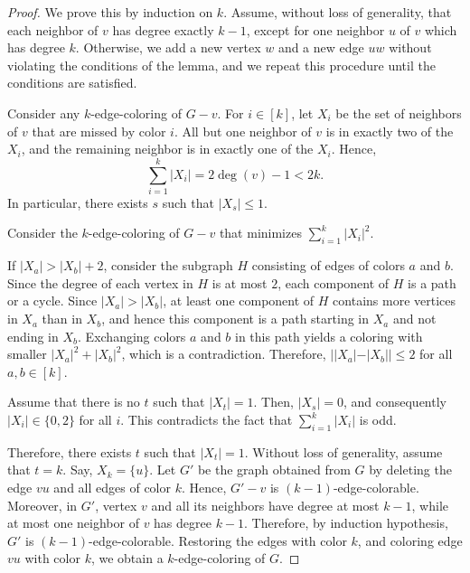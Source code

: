 \begin{proof}
    We prove this by induction on \(k\).
    Assume, without loss of generality,
    that each neighbor of \(v\) has degree exactly \(k-1\),
    except for one neighbor \(u\) of \(v\) which has degree \(k\).
    Otherwise, we add a new vertex \(w\) and a new edge \(uw\) without violating the conditions of the lemma,
    and we repeat this procedure until the conditions are satisfied.

    Consider any \(k\)-edge-coloring of \(G - v\).
    For \(i \in [k]\),
    let \(X_i\) be the set of neighbors of \(v\) that are missed by color \(i\).
    All but one neighbor of \(v\) is in exactly two of the \(X_i\),
    and the remaining neighbor is in exactly one of the \(X_i\).
    Hence,
    \begin{equation}
        \sum_{i=1}^k |X_i| = 2\deg(v) - 1 < 2k.
    \end{equation}
    In particular, there exists \(s\) such that \(|X_s| \leq 1\).

    Consider the \(k\)-edge-coloring of \(G - v\) that minimizes \(\sum_{i=1}^k |X_i|^2\).

    If \(|X_a| > |X_b| + 2\),
    consider the subgraph \(H\) consisting of edges of colors \(a\) and \(b\).
    Since the degree of each vertex in \(H\) is at most \(2\),
    each component of \(H\) is a path or a cycle.
    Since \(|X_a| > |X_b|\),
    at least one component of \(H\) contains more vertices in \(X_a\) than in \(X_b\),
    and hence this component is a path starting in \(X_a\) and not ending in \(X_b\).
    Exchanging colors \(a\) and \(b\) in this path
    yields a coloring with smaller \(|X_a|^2 + |X_b|^2\),
    which is a contradiction.
    Therefore,
    \(| |X_a| - |X_b| | \leq 2\) for all \(a, b \in [k]\).

    Assume that there is no \(t\) such that \(|X_t| = 1\).
    Then, \(|X_s| = 0\), and consequently \(|X_i| \in \{0, 2\}\) for all \(i\).
    This contradicts the fact that \(\sum_{i=1}^k |X_i|\) is odd.

    Therefore, there exists \(t\) such that \(|X_t| = 1\).
    Without loss of generality, assume that \(t = k\).
    Say, \(X_k = \{u\}\).
    Let \(G'\) be the graph obtained from \(G\)
    by deleting the edge \(vu\) and all edges of color \(k\).
    Hence, \(G' - v\) is \((k-1)\)-edge-colorable.
    Moreover, in \(G'\), vertex \(v\) and all its neighbors have degree at most \(k-1\), while at most one neighbor of \(v\) has degree \(k-1\).
    Therefore, by induction hypothesis,
    \(G'\) is \((k-1)\)-edge-colorable.
    Restoring the edges with color \(k\),
    and coloring edge \(vu\) with color \(k\),
    we obtain a \(k\)-edge-coloring of \(G\).
\end{proof}

